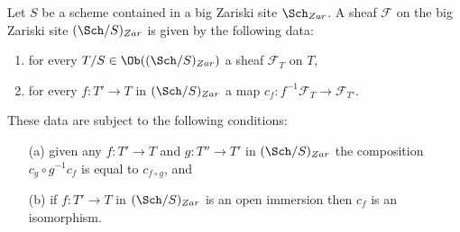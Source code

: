 \begin{lemma}
\label{lemma-characterize-sheaf-big}
Let $S$ be a scheme contained in a big Zariski site $\Sch_{Zar}$.
A sheaf $\mathcal{F}$ on the big Zariski site $(\Sch/S)_{Zar}$
is given by the following data:
\begin{enumerate}
\item for every $T/S \in \Ob((\Sch/S)_{Zar})$ a sheaf
$\mathcal{F}_T$ on $T$,
\item for every $f : T' \to T$ in
$(\Sch/S)_{Zar}$ a map
$c_f : f^{-1}\mathcal{F}_T \to \mathcal{F}_{T'}$.
\end{enumerate}
These data are subject to the following conditions:
\begin{enumerate}
\item[(a)] given any $f : T' \to T$ and $g : T'' \to T'$ in
$(\Sch/S)_{Zar}$ the composition $c_g \circ g^{-1}c_f$
is equal to $c_{f \circ g}$, and
\item[(b)] if $f : T' \to T$ in $(\Sch/S)_{Zar}$ is an
open immersion then $c_f$ is an isomorphism.
\end{enumerate}
\end{lemma}

